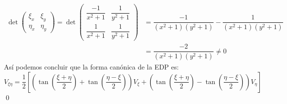\begin{homeworkProblem}
\begin{itemize}
\begin{solucion}
            \begin{align*}
               \det\begin{pmatrix}
                \xi_x &\xi_y\\
                \eta_x &\eta_y
            \end{pmatrix}=\det\begin{pmatrix}
             \dfrac{-1}{x^2+1}&\dfrac{1}{y^2+1}\\
             \dfrac{1}{x^2+1}&\dfrac{1}{y^2+1}
            \end{pmatrix}&=\dfrac{-1}{(x^2+1)(y^2+1)}-\dfrac{1}{(x^2+1)(y^2+1)} \\
            &=\dfrac{-2}{(x^2+1)(y^2+1)}\neq0
            \end{align*}
            Así podemos concluir que la forma canónica de la EDP es:
            $$V_{\xi\eta}=\dfrac{1}{2}\left[\left(\tan\left(\dfrac{\xi+\eta}{2}\right)+\tan\left(\dfrac{\eta-\xi}{2}\right)\right)V_\xi+\left(\tan\left(\dfrac{\xi+\eta}{2}\right)-\tan\left(\dfrac{\eta-\xi}{2}\right)\right)V_\eta\right]$$
            \qed
        \end{solucion}
    \end{itemize}
\end{homeworkProblem}
\newpage
